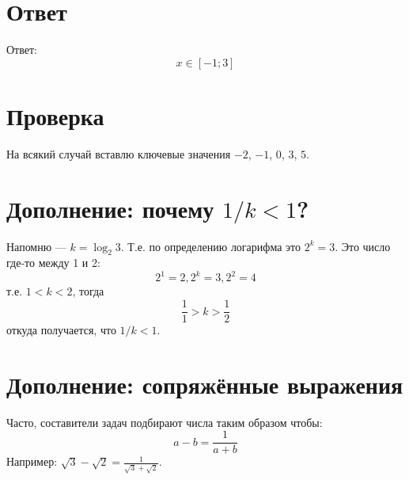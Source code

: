 \documentclass{article}
\begin{document}
\section{Ответ}
Ответ:
\[
x\in{}[-1;3]
\]

\section{Проверка}
На всякий случай вставлю ключевые значения $-2$, $-1$, $0$, $3$, $5$.

\section{Дополнение: почему $1/k<1$?}
Напомню --- $k=\log_{2}{3}$. Т.е. по определению логарифма это $2^k=3$. Это число где-то между 1 и 2:
\[
2^1=2, 2^k=3, 2^2=4
\]
т.е. $1<k<2$, тогда
\[
\frac{1}{1}>k>\frac{1}{2}
\]
откуда получается, что $1/k<1$.

\section{Дополнение: сопряжённые выражения}
Часто, составители задач подбирают числа таким образом чтобы:
\[
a-b=\frac{1}{a+b}
\]
Например: $\sqrt{3}-\sqrt{2}=\frac{1}{\sqrt{3}+\sqrt{2}}$.




\end{document}
